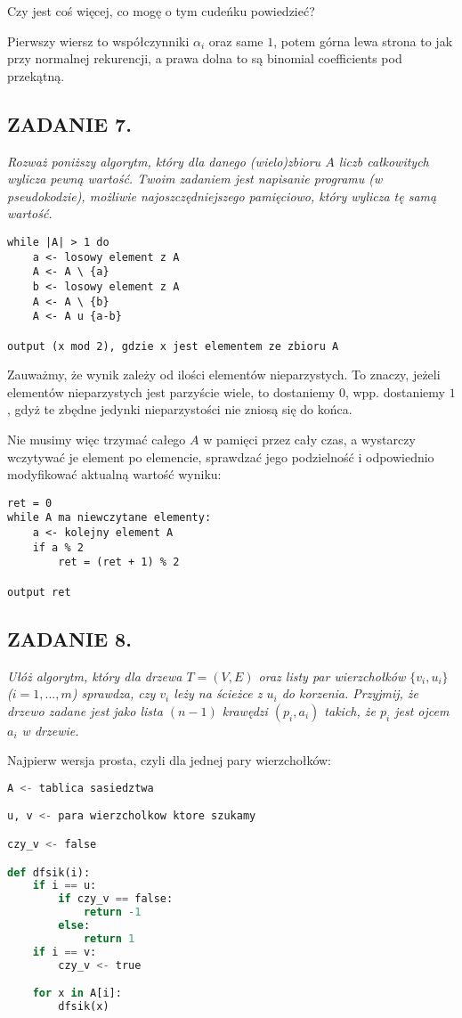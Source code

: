 \documentclass{article}
\begin{document}
{\color{orange}Czy jest coś więcej, co mogę o tym cudeńku powiedzieć?}

Pierwszy wiersz to współczynniki $\alpha_i$ oraz same $1$, potem górna lewa strona to jak przy normalnej rekurencji, a prawa dolna to są binomial coefficients pod przekątną.

\subsection*{ZADANIE 7.}
\emph{Rozważ poniższy algorytm, który dla danego (wielo)zbioru $A$ liczb całkowitych wylicza pewną wartość. Twoim zadaniem jest napisanie programu (w pseudokodzie), możliwie najoszczędniejszego pamięciowo, który wylicza tę samą wartość.}

\begin{lstlisting}
while |A| > 1 do
    a <- losowy element z A
    A <- A \ {a}
    b <- losowy element z A
    A <- A \ {b}
    A <- A u {a-b}

output (x mod 2), gdzie x jest elementem ze zbioru A
\end{lstlisting}
\smallskip

Zauważmy, że wynik zależy od ilości elementów nieparzystych. To znaczy, jeżeli elementów nieparzystych jest parzyście wiele, to dostaniemy $0$, wpp. dostaniemy $1$, gdyż te zbędne jedynki nieparzystości nie zniosą się do końca.

Nie musimy więc trzymać całego $A$ w pamięci przez cały czas, a wystarczy wczytywać je element po elemencie, sprawdzać jego podzielność i odpowiednio modyfikować aktualną wartość wyniku:
\begin{lstlisting}
ret = 0
while A ma niewczytane elementy:
    a <- kolejny element A
    if a % 2
        ret = (ret + 1) % 2
    
output ret
\end{lstlisting}

\subsection*{ZADANIE 8.}
\emph{Ułóż algorytm, który dla drzewa $T=(V, E)$ oraz listy par wierzchołków $\{v_i,u_i\}$ ($i=1,...,m$) sprawdza, czy $v_i$ leży na ścieżce z $u_i$ do korzenia. Przyjmij, że drzewo zadane jest jako lista $(n-1)$ krawędzi $(p_i,a_i)$ takich, że $p_i$ jest ojcem $a_i$ w drzewie.}

Najpierw wersja prosta, czyli dla jednej pary wierzchołków:
\begin{lstlisting}[language=Python]
A <- tablica sasiedztwa

u, v <- para wierzcholkow ktore szukamy

czy_v <- false

def dfsik(i):
    if i == u:
        if czy_v == false:
            return -1
        else:
            return 1
    if i == v:
        czy_v <- true

    for x in A[i]:
        dfsik(x)

\end{lstlisting}
\end{document}
